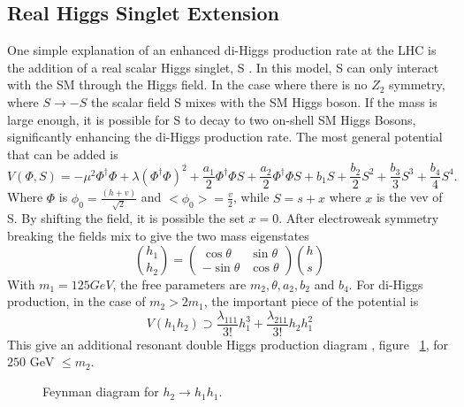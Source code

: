\subsection{Real Higgs Singlet Extension}
One simple explanation of an enhanced di-Higgs production rate at the LHC is the addition of a real scalar Higgs singlet, S \cite{Lewis:2017dme}. In this model, S can only interact with the SM through the Higgs field. In the case where there is no ${Z_{2}}$ symmetry, where ${S\rightarrow -S}$ the scalar field S mixes with the SM Higgs boson. If the mass is large enough, it is possible for S to decay to two on-shell SM Higgs Bosons, significantly enhancing the di-Higgs production rate.\newline
\indent The most general potential that can be added is 
\begin{equation}
V(\Phi,S) = -\mu^{2}\Phi^{\dagger}\Phi + \lambda(\Phi^{\dagger}\Phi)^{2} + \frac{a_{1}}{2}\Phi^{\dagger}\Phi S + \frac{a_{2}}{2}\Phi^{\dagger}\Phi S + b_{1}S + \frac{b_{2}}{2}S^{2} + \frac{b_{3}}{3}S^{3} + \frac{b_{4}}{4}S^{4}.
\end{equation}
Where $\Phi$ is ${\phi_{0} = \frac{(h + v)}{\sqrt{2}}}$ and ${<\phi_{0}> = \frac{v}{2}}$, while ${S = s + x}$ where ${x}$ is the vev of S. By shifting the field, it is possible the set ${x = 0}$. After electroweak symmetry breaking the fields mix to give the two mass eigenstates
\begin{equation}
\binom{h_{1}}{h_{2}} = 
\begin{pmatrix}
\cos{\theta} & \sin{\theta}\\
-\sin{\theta} & \cos{\theta}
\end{pmatrix}
\binom{h}{s}
\end{equation}
With ${m_{1} = 125 GeV}$, the free parameters are ${m_{2}, \theta,a_{2},b_{2}}$ and ${b_{4}}$. For di-Higgs production, in the case of ${m_{2}>2m_{1}}$, the important piece of the potential is 
\begin{equation}
V(h_{1}h_{2}) \supset \frac{\lambda_{111}}{3!}h_{1}^{3} + \frac{\lambda_{211}}{3!}h_{2}h_{1}^{2}
\end{equation}
This give an additional resonant double Higgs production diagram , figure ~\ref{fig:FeyRes}, for ${250 \text{ GeV } \leq m_{2}}$.
\begin{figure}[h]
\begin{center}
\caption[Resonant di-Higgs production diagram]{Feynman diagram for ${h_{2}\rightarrow h_{1}h_{1}}$.}
\label{fig:FeyRes}
\end{center}
\end{figure}

